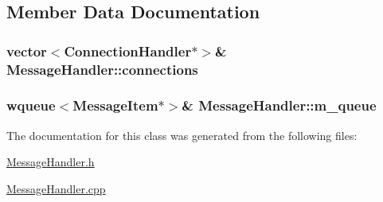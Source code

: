 \subsection{Member Data Documentation}
\hypertarget{classMessageHandler_afa53d2ec50ed4c6d9db5b47d1d10ee21}{
\subsubsection[{connections}]{\setlength{\rightskip}{0pt plus 5cm}vector$<${\bf Connection\+Handler}$\ast$$>$\& Message\+Handler\+::connections\hspace{0.3cm}{\ttfamily [private]}}}\label{classMessageHandler_afa53d2ec50ed4c6d9db5b47d1d10ee21}
\hypertarget{classMessageHandler_a38e2fbf09216eacac420ef29c91b546f}{
\subsubsection[{m\+\_\+queue}]{\setlength{\rightskip}{0pt plus 5cm}wqueue$<${\bf Message\+Item}$\ast$$>$\& Message\+Handler\+::m\+\_\+queue\hspace{0.3cm}{\ttfamily [private]}}}\label{classMessageHandler_a38e2fbf09216eacac420ef29c91b546f}


The documentation for this class was generated from the following files\+:\begin{DoxyCompactItemize}
\item 
\hyperlink{MessageHandler_8h}{Message\+Handler.\+h}\item 
\hyperlink{MessageHandler_8cpp}{Message\+Handler.\+cpp}\end{DoxyCompactItemize}
